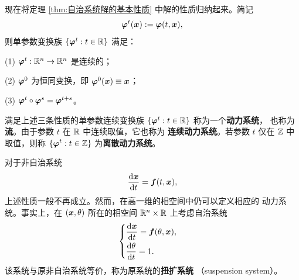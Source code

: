 现在将定理 \ref{thm:自治系统解的基本性质} 中解的性质归纳起来。简记
\[
	\boldsymbol{\varphi}^{t}(\boldsymbol{x})
	\mathrel{:=}\boldsymbol{\varphi}(t,\boldsymbol{x}),
\]
则单参数变换族
$\{\boldsymbol{\varphi}^{t}:t\in\mathbb{R}\}$ 满足：

\textnormal{(1)} $\boldsymbol{\varphi}^{t}:\mathbb{R}^n\to\mathbb{R}^n$ 是连续的；

\textnormal{(2)} $\boldsymbol{\varphi}^{0}$ 为恒同变换，即
$\boldsymbol{\varphi}^{0}(\boldsymbol{x})\equiv\boldsymbol{x}$；

\textnormal{(3)}
$\boldsymbol{\varphi}^{t}\circ\boldsymbol{\varphi}^{s}
=\boldsymbol{\varphi}^{t+s}$。

\begin{definition}\label{def:动力系统与流}
	满足上述三条性质的单参数连续变换族
	$\{\boldsymbol{\varphi}^{t}:t\in\mathbb{R}\}$ 称为一个\textbf{动力系统}，
	也称为\textbf{流}。由于参数 $t$ 在 $\mathbb{R}$ 中连续取值，它也称为
	\textbf{连续动力系统}。若参数 $t$ 仅在 $\mathbb{Z}$ 中取值，则称
	$\{\boldsymbol{\varphi}^{t}:t\in\mathbb{Z}\}$ 为\textbf{离散动力系统}。
\end{definition}

对于非自治系统
\[
	\dfrac{\mathrm{d}\boldsymbol{x}}{\mathrm{d} t}=\boldsymbol{f}(t,\boldsymbol{x}),
\]
上述性质一般不再成立。然而，在高一维的相空间中仍可以定义相应的
动力系统。事实上，在 $(\boldsymbol{x},\theta)$ 所在的相空间
$\mathbb{R}^n\times\mathbb{R}$ 上考虑自治系统
\[
	\begin{cases}
		\dfrac{\mathrm{d}\boldsymbol{x}}{\mathrm{d} t}=\boldsymbol{f}(\theta,\boldsymbol{x}),\\[6pt]
		\dfrac{\mathrm{d}\theta}{\mathrm{d} t}=1.
	\end{cases}
\]
该系统与原非自治系统等价，称为原系统的\textbf{扭扩系统}
（suspension system）。

